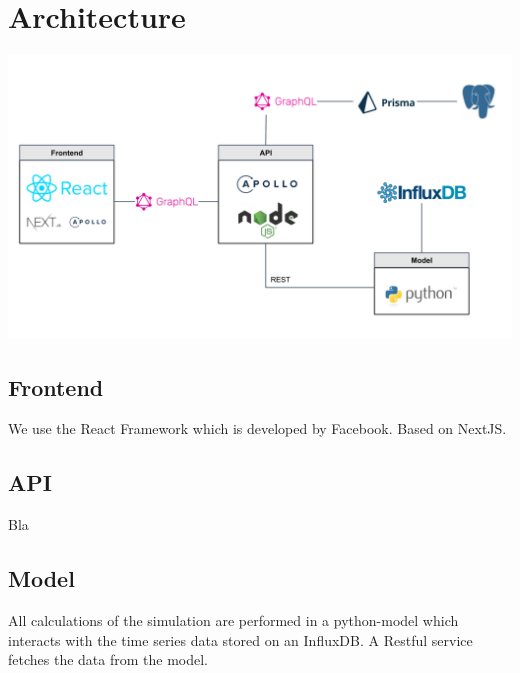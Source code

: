 \section{Architecture}

\begin{center}
  \includegraphics[scale=0.35]{img/architecture.png}
\end{center}

\subsection{Frontend}
We use the React Framework which is developed by Facebook. Based on NextJS.

\subsection{API}
Bla


\subsection{Model}
All calculations of the simulation are performed in a python-model which interacts with the time series data stored on an InfluxDB. A Restful service fetches the data from the model.
